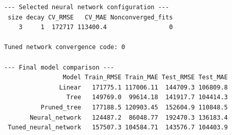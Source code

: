 \documentclass[11pt,a4paper]{article}
\begin{document}
\begin{lstlisting}[style=console]
--- Selected neural network configuration ---
 size decay CV_RMSE   CV_MAE Nonconverged_fits
    3     1  172717 113400.4                 0

Tuned network convergence code: 0 

--- Final model comparison ---
                Model Train_RMSE Train_MAE Test_RMSE Test_MAE
               Linear   171775.1 117006.11  144709.3 106809.8
                 Tree   149769.0  99614.18  141917.7 104414.3
          Pruned_tree   177188.5 120903.45  152604.9 110848.5
       Neural_network   124487.2  86048.77  192470.3 136183.4
 Tuned_neural_network   157507.3 104584.71  143576.7 104403.9
\end{lstlisting}
\end{document}
